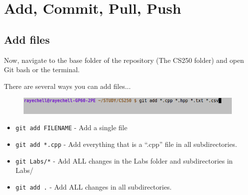 \documentclass[a4paper,12pt,oneside]{book}
\begin{document}
        \renewcommand*\DTstylecomment{\rmfamily\color{green}\textsc}

        \begin{framed}
        \end{framed}

    \section{Add, Commit, Pull, Push}

        \subsection{Add files}

        Now, navigate to the base folder of the repository (The CS250 folder)
        and open Git bash or the terminal.

        There are several ways you can add files...

        \begin{figure}[h]
            \centering
            \includegraphics[width=14cm]{images/git-add.png}
        \end{figure}

        \begin{itemize}
            \item   \texttt{git add FILENAME} - Add a single file
            \item   \texttt{git add *.cpp} - Add everything that is a ``.cpp'' file in all subdirectories.
            \item   \texttt{git Labs/*} - Add ALL changes in the Labs folder and subdirectories in Labs/
            \item   \texttt{git add .} - Add ALL changes in all subdirectories.
        \end{itemize}
\end{document}
